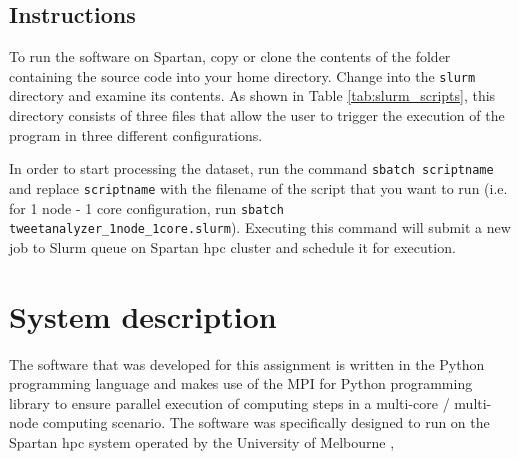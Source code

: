\documentclass[paper=a4, fontsize=11pt]{scrartcl}
\numberwithin{equation}{section}		%
\numberwithin{figure}{section}			%
\numberwithin{table}{section}				%
\begin{document}
\subsection{Instructions}
To run the software on Spartan, copy or clone the contents of the folder containing the source code into your home directory. Change into the \texttt{slurm} directory and examine its contents. As shown in Table \ref{tab:slurm_scripts}, this directory consists of three files that allow the user to trigger the execution of the program in three different configurations.
\begin{table}[]
\tiny
{}
\label{tab:slurm_scripts}
\caption{Resource configuration, corresponding SLURM script and execution time}
\end{table}
\newline
In order to start processing the dataset, run the command \texttt{sbatch scriptname} and replace \texttt{scriptname} with the filename of the script that you want to run (i.e. for 1 node - 1 core configuration, run \texttt{sbatch  tweetanalyzer\_1node\_1core.slurm}). Executing this command will submit a new job to Slurm queue on Spartan \acrshort{hpc} cluster and schedule it for execution.

\section{System description}
\label{cha:system_description}
The software that was developed for this assignment is written in the Python programming language and makes use of the MPI for Python programming library \citep{RN310} to ensure parallel execution of computing steps in a multi-core / multi-node computing scenario. The software was specifically designed to run on the Spartan \acrshort{hpc} system operated by the University of Melbourne \citep{RN309},
\end{document}
